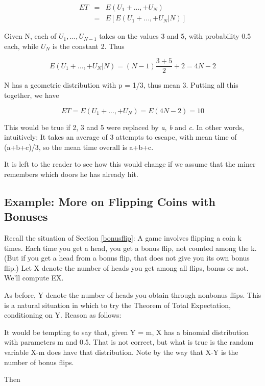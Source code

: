 \begin{eqnarray}
ET &=& E(U_1+...,+U_N) \\ 
&=& E \left [ E(U_1+...,+U_N | N) \right ] 
\end{eqnarray}

Given N, each of $U_1,...,U_{N-1}$ takes on the values 3 and 5, with
probability 0.5 each, while $U_N$ is the constant 2.  Thus

\begin{equation}
E(U_1+...,+U_N | N) = (N-1) \frac{3+5}{2} + 2 = 4N - 2
\end{equation}

N has a geometric distribution with p = 1/3, thus mean 3.  Putting all
this together, we have

\begin{equation}
ET = E(U_1+...,+U_N) = E(4N - 2) = 10
\end{equation}

This would be true if 2, 3 and 5 were replaced by {\it a}, {\it b} and
{\it c}.  In other words, intuitively:  It takes an average of 3 attempts to
escape, with mean time of (a+b+c)/3, so the mean time overall is a+b+c.

It is left to the reader to see how this would change if we assume that the
miner remembers which doors he has already hit.

\subsection{Example:  More on Flipping Coins with Bonuses}

Recall the situation of Section \ref{bonusflip}:  A game involves
flipping a coin k times.  Each time you get a head, you get a bonus
flip, not counted among the k.  (But if you get a head from a bonus
flip, that does not give you its own bonus flip.) Let X denote the
number of heads you get among all flips, bonus or not.   We'll compute
EX.

As before, Y denote the number of heads you obtain through
nonbonus flips.   This is a natural situation in which to try the
Theorem of Total Expectation, conditioning on Y.  Reason as follows:

It would be tempting to say that, given Y = m, X has a binomial
distribution with parameters m and 0.5.  That is not correct, but what
is true is the random variable X-m does have that distribution.   Note
by the way that X-Y is the number of bonus flips.

Then

